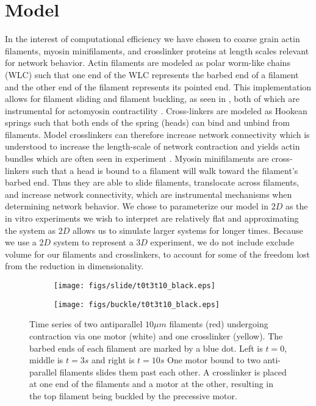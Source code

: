 \documentclass[12pt]{article}
\begin{document}
\section{Model}  
In the interest of computational efficiency we have chosen to coarse grain actin filaments, myosin minifilaments, and
crosslinker proteins at length scales relevant for network behavior. Actin filaments are
modeled as polar worm-like chains (WLC) such that one end of the WLC represents the barbed end of a filament and the
other end of the filament represents its pointed end. This implementation allows for filament sliding and filament
buckling, as seen in , both of which are instrumental for actomyosin contractility \cite{murrell2012}. 
Cross-linkers are modeled as Hookean springs such
that both ends of the spring (heads) can bind and unbind from filaments. Model crosslinkers can therefore increase network connectivity
which is understood to increase the length-scale of network contraction \cite{murrell2015} and yields actin bundles
which are often seen in experiment \cite{gardel2004, murrell2012, murrell2014}. Myosin minifilaments are cross-linkers such
that a head is bound to a filament will walk toward the filament's barbed end. Thus they are able to slide filaments,
translocate across filaments, and increase network connectivity, which are instrumental mechanisms when determining
network behavior\cite{murrell2014}. We chose to parameterize our model in $2D$ as the in vitro experiments we wish to
interpret are relatively flat and
approximating the system as $2D$ allows us to simulate larger systems for longer times. Because we use a $2D$ system to
represent a $3D$ experiment, we do not include exclude volume for our filaments and crosslinkers, to account for
some of the freedom lost from the reduction in dimensionality.
\begin{figure}[H] 
  \centering
  \begin{subfigure}{0.95\textwidth}
    \centering
    \texttt{[image: figs/slide/t0t3t10\_black.eps]}
    \caption{\label{fig:slide}}
  \end{subfigure}
  \begin{subfigure}{0.95\textwidth}
    \centering
    \texttt{[image: figs/buckle/t0t3t10\_black.eps]}
    \caption{\label{fig:buckle}}
  \end{subfigure}
  \caption{%
  \label{fig:toys}%
  Time series of two antiparallel $10\mu m$ filaments (red) undergoing contraction via one motor (white) and one
  crosslinker (yellow). The barbed ends of each filament are marked by a blue dot. Left is $t = 0$, middle is $t = 3s$
  and right is $t = 10s$
   One motor bound to two anti-parallel filaments slides them past each other. 
   A crosslinker is placed at one end of the filaments and a motor at the other, resulting in 
the top filament being buckled by the precessive motor.} 
\end{figure}
\end{document}
